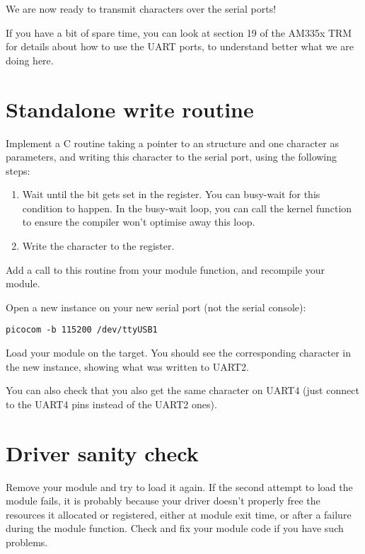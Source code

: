 We are now ready to transmit characters over the serial ports!

If you have a bit of spare time, you can look at section 19 of the
AM335x TRM for details about how to use the UART ports, to understand
better what we are doing here.

\section{Standalone write routine}

Implement a C routine taking a pointer to an 
structure and one character as parameters, and writing
this character to the serial port, using the following steps:

\begin{enumerate}
\item Wait until the  bit gets set in the
   register.  You can busy-wait for this condition to happen.
  In the busy-wait loop, you can call the  kernel function
  to ensure the compiler won't optimise away this loop.
\item Write the character to the  register.
\end{enumerate}

Add a call to this routine from your module  function,
and recompile your module.

Open a new  instance on your new serial port (not the
serial console):

\begin{verbatim}
picocom -b 115200 /dev/ttyUSB1
\end{verbatim}

Load your module on the target. You should see the
corresponding character in the new  instance,
showing what was written to UART2.

You can also check that you also get the same character on UART4
(just connect to the UART4 pins instead of the UART2 ones).

\section{Driver sanity check}

Remove your module and try to load it again. If the second attempt to
load the module fails, it is probably because your driver doesn't
properly free the resources it allocated or registered, either at module
exit time, or after a failure during the module  function. Check
and fix your module code if you have such problems.
